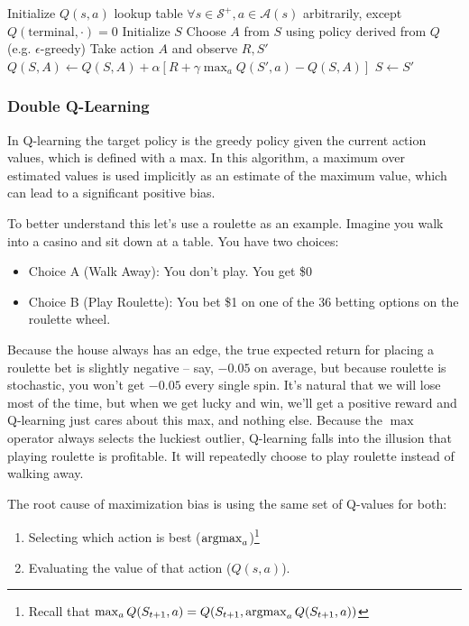 \begin{algorithm}
    \caption{Q-learning (Off-Policy TD Control)}
    \begin{algorithmic}[1]
        \State Initialize $Q(s,a)$ lookup table $\forall s \in \mathcal{S}^+, a \in \mathcal{A}(s)$ arbitrarily, except $Q(\text{terminal}, \cdot) = 0$
            \State Initialize $S$
                \State Choose $A$ from $S$ using policy derived from $Q$ (e.g. $\epsilon$-greedy)
                \State Take action $A$ and observe $R, S'$
                \State $Q(S,A) \gets Q(S,A) + \alpha \left[ R + \gamma \max_{a} Q(S',a) - Q(S,A) \right]$
                \State $S \gets S'$
            \EndFor
    \end{algorithmic}
\end{algorithm}

\subsubsection{Double Q-Learning}
In Q-learning the target policy is the greedy policy given the current action values, which is defined with a max. In this algorithm, a maximum over estimated values is used implicitly as an estimate of the
maximum value, which can lead to a significant positive bias. 

To better understand this let's use a roulette as an example. Imagine you walk into a casino and sit down at a table. You have two choices:
\begin{itemize}
    \item Choice A (Walk Away): You don't play. You get \$0
    \item Choice B (Play Roulette): You bet \$1 on one of the 36 betting options on the roulette wheel.
\end{itemize}
Because the house always has an edge, the true expected return for placing a roulette bet is slightly negative -- say, $-0.05$ on average, but because roulette is stochastic, you won't get $-0.05$ every single spin. It's natural that we will lose most of the time, but when we get lucky and win, we'll get a positive reward and Q-learning just cares about this max, and nothing else. Because the $\max$ operator always selects the luckiest outlier, Q-learning falls into the illusion that playing roulette is profitable. It will repeatedly choose to play roulette instead of walking away.

The root cause of maximization bias is using the same set of Q-values for both:
\begin{enumerate}
    \item Selecting which action is best ($\operatorname*{argmax}_a$)\footnote{Recall that $\max_a Q(S_{t+1}, a) = Q(S_{t+1}, \operatorname*{argmax}_a Q(S_{t+1},a))$}
    \item Evaluating the value of that action ($Q(s, a)$).
\end{enumerate}

